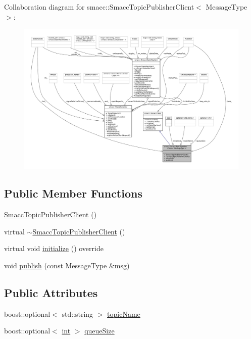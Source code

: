 Collaboration diagram for smacc\+:\+:Smacc\+Topic\+Publisher\+Client$<$ Message\+Type $>$\+:
\nopagebreak
\begin{figure}[H]
\begin{center}
\leavevmode
\includegraphics[width=350pt]{classsmacc_1_1SmaccTopicPublisherClient__coll__graph}
\end{center}
\end{figure}
\subsection*{Public Member Functions}
\begin{DoxyCompactItemize}
\item 
\hyperlink{classsmacc_1_1SmaccTopicPublisherClient_a1e1d04797b5930ba6f4cc6198b2ff3a7}{Smacc\+Topic\+Publisher\+Client} ()
\item 
virtual \hyperlink{classsmacc_1_1SmaccTopicPublisherClient_aab87bffc59484ab72f62966cd76b31e4}{$\sim$\+Smacc\+Topic\+Publisher\+Client} ()
\item 
virtual void \hyperlink{classsmacc_1_1SmaccTopicPublisherClient_ab2195989f5106a0f2a01546bebd50991}{initialize} () override
\item 
void \hyperlink{classsmacc_1_1SmaccTopicPublisherClient_a8f72ebf2cdb0b56b8288fde14c787c01}{publish} (const Message\+Type \&msg)
\end{DoxyCompactItemize}
\subsection*{Public Attributes}
\begin{DoxyCompactItemize}
\item 
boost\+::optional$<$ std\+::string $>$ \hyperlink{classsmacc_1_1SmaccTopicPublisherClient_ada35d87707eacd2ad863322ddf087b5b}{topic\+Name}
\item 
boost\+::optional$<$ \hyperlink{classint}{int} $>$ \hyperlink{classsmacc_1_1SmaccTopicPublisherClient_af6094c0d04c48cec8334ced16e36d998}{queue\+Size}
\end{DoxyCompactItemize}
